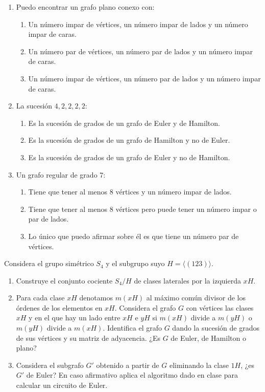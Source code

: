 \begin{ejercicio}
\begin{enumerate}
\begin{enumerate}
        \end{enumerate}
        \item Puedo encontrar un grafo plano conexo con:
        \begin{enumerate}
            \item Un número impar de vértices, un número impar de lados y un número impar de caras.
            \item Un número par de vértices, un número par de lados y un número impar de caras.
            \item Un número impar de vértices, un número par de lados y un número impar de caras.
        \end{enumerate}
        \item La sucesión $4, 2, 2, 2, 2$:
        \begin{enumerate}
            \item Es la sucesión de grados de un grafo de Euler y de Hamilton.
            \item Es la sucesión de grados de un grafo de Hamilton y no de Euler.
            \item Es la sucesión de grados de un grafo de Euler y no de Hamilton.
        \end{enumerate}
        \item Un grafo regular de grado 7:
        \begin{enumerate}
            \item Tiene que tener al menos 8 vértices y un número impar de lados.
            \item Tiene que tener al menos 8 vértices pero puede tener un número impar o par de lados.
            \item Lo único que puedo afirmar sobre él es que tiene un número par de vértices.
        \end{enumerate}
    \end{enumerate}
\end{ejercicio}


\begin{ejercicio}\label{ej:1.32}
    Considera el grupo simétrico $S_4$ y el subgrupo suyo $H = \langle (1 2 3) \rangle$.
    \begin{enumerate}
        \item Construye el conjunto cociente $S_4/H$ de clases laterales por la izquierda $xH$.
        \item Para cada clase $xH$ denotamos $m(xH)$ al máximo común divisor de los órdenes de los elementos en $xH$. Considera el grafo $G$ con vértices las clases $xH$ y en el que hay un lado entre $xH$ e $yH$ si $m(xH)$ divide a $m(yH)$ o $m(yH)$ divide a $m(xH)$. Identifica el grafo $G$ dando la sucesión de grados de sus vértices y su matriz de adyacencia. ¿Es $G$ de Euler, de Hamilton o plano?
        \item Considera el subgrafo $G'$ obtenido a partir de $G$ eliminando la clase $1H$, ¿es $G'$ de Euler? En caso afirmativo aplica el algoritmo dado en clase para calcular un circuito de Euler.
    \end{enumerate}
\end{ejercicio}

